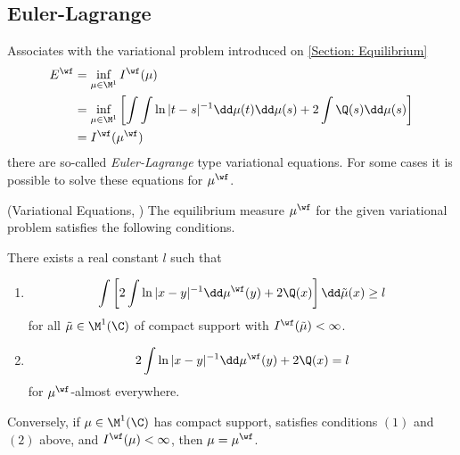 \subsection{Euler-Lagrange}

Associates with the variational problem introduced on \autoref{Section: Equilibrium}
\begin{align}
	E^{\wf} & = \inf_{\mu \in \M^1} I^{\wf} (\mu) \\
	& =   \inf_{\mu \in \M^1} \left[ \int \int \ln |t - s|^{-1} \dd \mu(t) \dd \mu(s) + 2 \int \Q(s) \dd  \mu(s) \right] \\
	&  = I^{\wf} (\mu^{\wf})
\end{align}
there are so-called \textit{Euler-Lagrange} type variational equations. For some cases it is possible to solve these equations for $\mu^{\wf}$.

\begin{teorema} (Variational Equations, \cite{deiftorthogonal})
	The equilibrium measure $\mu^\wf$ for the given variational problem satisfies the following conditions. 
	
	There exists a real constant $l$ such that 
	\begin{enumerate}
		\item
		\begin{equation}
			\int \left[ 2 \int \ln{|x-y|^{-1}} \dd \mu^\wf(y) + 2 \Q(x) \right] \dd \tilde{\mu}(x) \geq l
		\end{equation}
		for all $\tilde{\mu} \in \M^1(\C)$ of compact support with $I^\wf(\tilde{\mu}) < \infty$.
		\item
			\begin{equation}
		2 \int \ln{|x-y|^{-1}} \dd \mu^\wf(y) + 2 \Q(x) = l
		\end{equation}
		for $\mu^\wf$-almost everywhere.
	\end{enumerate}
	Conversely, if $\mu \in \M^1(\C)$ has compact support, satisfies conditions $(1)$ and $(2)$ above, and $I^\wf(\mu) < \infty$, then $\mu = \mu^\wf$.
\end{teorema}


